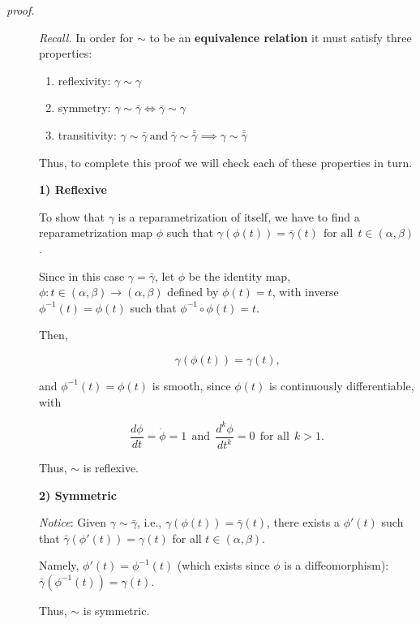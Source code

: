 \documentclass[
]{article}
\providecommand{\tightlist}{%
  \setlength{\itemsep}{0pt}\setlength{\parskip}{0pt}}
\begin{document}
\begin{description}
\item[\emph{proof.}]
\emph{Recall.} In order for \(\sim\) to be an \textbf{equivalence
relation} it must satisfy three properties:

\begin{enumerate}
\def\labelenumi{\arabic{enumi}.}
\tightlist
\item
  reflexivity: \(\gamma \sim \gamma\)
\item
  symmetry: \(\gamma \sim \bar{\gamma} \iff \bar{\gamma} \sim \gamma\)
\item
  transitivity:
  \(\gamma \sim \bar{\gamma} ~ \text{and} ~ \bar{\gamma} \sim \bar{\bar{\gamma}} \implies \gamma \sim \bar{\bar{\gamma}}\)
\end{enumerate}

Thus, to complete this proof we will check each of these properties in
turn.

\textbf{1) Reflexive}

To show that \(\gamma\) is a reparametrization of itself, we have to
find a reparametrization map \(\phi\) such that
\(\gamma(\phi(t)) = \bar{\gamma}(t) ~~ \text{for all} ~~ t \in (\alpha,\beta)\).

Since in this case \(\gamma = \bar{\gamma}\), let \(\phi\) be the
identity map, \(\phi: t \in (\alpha,\beta) \rightarrow (\alpha,\beta)\)
defined by \(\phi(t) = t\), with inverse \(\phi^{-1}(t) = \phi(t)\) such
that \(\phi^{-1} \circ \phi(t) = t\).

Then,

\[
\gamma(\phi(t)) = \gamma(t) \text{,}
\]

and \(\phi^{-1}(t) = \phi(t)\) is smooth, since \(\phi(t)\) is
continuously differentiable, with

\[
\frac{d\phi}{dt} = \dot{\phi} = 1 ~~ \text{and} ~~ \frac{d^k\phi}{dt^k} = 0 ~~ \text{for all} ~~ k > 1 \text{.}
\]

Thus, \(\sim\) is reflexive.

\textbf{2) Symmetric}

\emph{Notice}: Given \(\gamma \sim \bar{\gamma}\), i.e.,
\(\gamma(\phi(t)) = \bar{\gamma}(t)\), there exists a \(\phi'(t)\) such
that \(\bar{\gamma}(\phi'(t)) = \gamma(t)\) for all
\(t \in (\alpha,\beta)\).

Namely, \(\phi'(t) = \phi^{-1}(t)\) (which exists since \(\phi\) is a
diffeomorphism): \(\bar{\gamma}(\phi^{-1}(t)) = \gamma(t)\).

Thus, \(\sim\) is symmetric.


\end{description}
\end{document}
